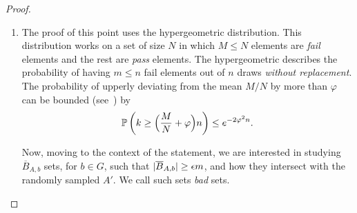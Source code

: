 \begin{lemma}
\begin{enumerate}[label=(\alph*), ref=\alph*]
            \end{enumerate}
            \begin{proof}
            \begin{enumerate}[label=(\alph*), ref=\alph*]
                \item The proof of this point uses the hypergeometric distribution.
                    This distribution works on a set of size $N$ in which $M \leq N$ elements are \emph{fail} elements
                    and the rest are \emph{pass} elements.
                    The hypergeometric describes the probability of having $m \leq n$ fail elements out of $n$ draws
                    \emph{without replacement}.
                    The probability of upperly deviating from the mean $M/N$ by more than $\varphi$ can be bounded
                    (see~\cite{hypergeometric_tail_inequalities_ending_the_insanity, the_tail_od_the_hypergeometric_distribution})
                    by
                    \begin{equation} \label{eq:hypergeometric_bound}
                        \mathbb{P}\left( k \geq \Bigl( \frac{M}{N} + \varphi \Bigr) n \right) \leq e^{-2 \varphi^2 n}.
                    \end{equation}

                    Now, moving to the context of the statement, we are interested in studying $\overline{B}_{A,b}$ sets,
                    for $b\in G$, such that $| \overline{B}_{A,b} | \geq \epsilon m$, and how they intersect with the
                    randomly sampled $A'$.
                    We call such sets \emph{bad} sets.


\end{enumerate}
\end{proof}
\end{lemma}
